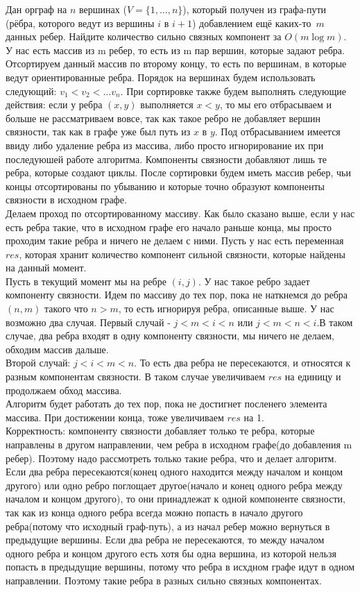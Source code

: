\documentclass[12pt]{extreport}
\theoremstyle{definiton}
\theoremstyle{definition}
\theoremstyle{definition}
\begin{document}
	\Pr[3]  Дан орграф на $n$ вершинах ($V = \{1,\ldots, n\}$), который получен из графа-пути (рёбра, которого ведут из вершины $i$ в $i+1$) добавлением ещё каких-то~$m$ данных ребер. Найдите количество сильно связных компонент за $O(m\log m)$.
	\newline
	\\У нас есть массив из m ребер, то есть из m пар вершин, которые задают ребра. Отсортируем данный массив по второму концу, то есть по вершинам, в которые ведут ориентированные ребра. Порядок на вершинах будем использовать следующий: $v_1 < v_2 < \ldots v_n$. При сортировке также будем выполнять следующие действия: если у ребра $(x,y)$ выполняется $x < y$, то мы его отбрасываем и больше не рассматриваем вовсе, так как такое ребро не добавляет вершин связности, так как в графе уже был путь из $x$ в $y$. Под отбрасыванием имеется ввиду либо удаление ребра из массива, либо просто игнорирование их при последуюшей работе алгоритма. Компоненты связности добавляют лишь те ребра, которые создают циклы. После сортировки будем иметь массив ребер, чьи концы отсортированы по убыванию и которые точно образуют компоненты связности в исходном графе.
	\\ Делаем проход по отсортированному массиву. Как было сказано выше, если у нас есть ребра такие, что в исходном графе его начало раньше конца, мы просто проходим такие ребра и ничего не делаем с ними. Пусть у нас есть переменная $res$, которая хранит количество компонент сильной связности, которые найдены на данный момент.
	\\ Пусть в текущий момент мы на ребре $(i, j)$. У нас такое ребро задает компоненту связности. Идем по массиву до тех пор, пока не наткнемся до ребра $(n,m)$ такого что $n > m$, то есть игнорируя ребра, описанные выше. У нас возможно два случая. Первый случай - $j<m<i<n$ или $j<m<n<i$.В таком случае, два ребра входят в одну компоненту связности, мы ничего не делаем, обходим массив дальше.
	\\Второй случай: $j<i<m<n$. То есть два ребра не пересекаются, и относятся к разным компонентам связности. В таком случае увеличиваем $res$ на единицу и продолжаем обход массива.
	\\Алгоритм будет работать до тех пор, пока не достигнет посленего элемента массива. При достижении конца, тоже увеличиваем $res$ на 1.
	\\Корректность: компоненту связности добавляет только те ребра, которые направлены в другом направлении, чем ребра в исходном графе(до добавления m ребер). Поэтому надо рассмотреть только такие ребра, что и делает алгоритм. Если два ребра пересекаются(конец одного находится между началом и концом другого) или одно ребро поглощает другое(начало и конец одного ребра между началом и концом другого), то они принадлежат к одной компоненте связности, так как из конца одного ребра всегда можно попасть в начало другого ребра(потому что исходный граф-путь), а из начал ребер можно вернуться в предыдущие вершины. Если два ребра не пересекаются, то между началом одного ребра и концом другого есть хотя бы одна вершина, из которой нельзя попасть в предыдущие вершины, потому что ребра в исхдном графе идут в одном направлении. Поэтому такие ребра в разных сильно связных компонентах.
\end{document}
